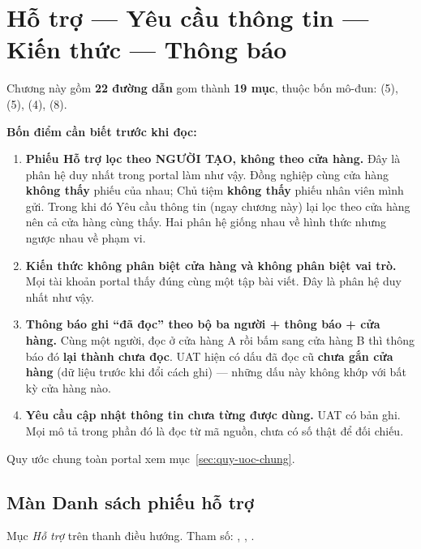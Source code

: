 \chapter{Hỗ trợ --- Yêu cầu thông tin --- Kiến thức --- Thông báo}

Chương này gồm \textbf{22 đường dẫn} gom thành \textbf{19 mục}, thuộc bốn mô-đun:
 (5),  (5),
 (4),  (8).

\textbf{Bốn điểm cần biết trước khi đọc:}

\begin{enumerate}[leftmargin=*]
  \item \textbf{Phiếu Hỗ trợ lọc theo NGƯỜI TẠO, không theo cửa hàng.} Đây là phân hệ duy nhất
        trong portal làm như vậy. Đồng nghiệp cùng cửa hàng \textbf{không thấy} phiếu của nhau;
        Chủ tiệm \textbf{không thấy} phiếu nhân viên mình gửi. Trong khi đó Yêu cầu thông tin
        (ngay chương này) lại lọc theo cửa hàng nên cả cửa hàng cùng thấy. Hai phân hệ giống
        nhau về hình thức nhưng ngược nhau về phạm vi.
  \item \textbf{Kiến thức không phân biệt cửa hàng và không phân biệt vai trò.} Mọi tài khoản
        portal thấy đúng cùng một tập bài viết. Đây là phân hệ duy nhất như vậy.
  \item \textbf{Thông báo ghi ``đã đọc'' theo bộ ba người + thông báo + cửa hàng.} Cùng một
        người, đọc ở cửa hàng A rồi bấm sang cửa hàng B thì thông báo đó \textbf{lại thành chưa
        đọc}. UAT hiện có  dấu đã đọc cũ \textbf{chưa gắn cửa hàng} (dữ liệu trước khi đổi
        cách ghi) --- những dấu này không khớp với bất kỳ cửa hàng nào.
  \item \textbf{Yêu cầu cập nhật thông tin chưa từng được dùng.} UAT có  bản ghi. Mọi mô
        tả trong phần đó là đọc từ mã nguồn, chưa có số thật để đối chiếu.
\end{enumerate}

Quy ước chung toàn portal xem mục~\ref{sec:quy-uoc-chung}.

\section{Màn Danh sách phiếu hỗ trợ}
\medskip

\mvao

Mục \emph{Hỗ trợ} trên thanh điều hướng. Tham số: , , .

